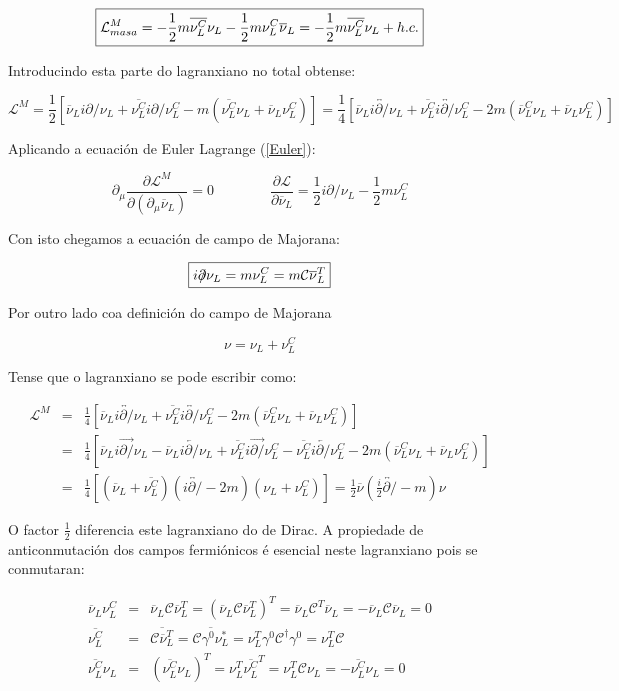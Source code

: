 \documentclass[a4paper,10pt]{article}
\newcommand{\beq}{\begin{equation}}
\newcommand{\eeq}{\end{equation}}
\newcommand{\bea}{\begin{eqnarray}}
\newcommand{\eea}{\end{eqnarray}}
\newcommand{\bbx}{\begin{boxed}}
\newcommand{\ebx}{\end{boxed}}
\newcommand{\barra}[1]{\overline{#1}}
\newcommand{\lvec}[1]{\overleftarrow{#1}}
\newcommand{\rvec}[1]{\overrightarrow{#1}}
\newcommand{\dvec}[1]{\overleftrightarrow{#1}}
\newcommand{\chula}[1]{\mathcal{#1}}
\newcommand{\slx}[1]{ #1\!\!\!/ }
\newcommand{\derp}[2]{\frac{\partial#1}{\partial#2}}
\begin{document}
\beq
\bbx{
\chula L_{masa}^M = -\frac{1}{2} m \barra{\nu_L^C} \nu_L - \frac{1}{2} m \nu_L^C \barra\nu_L = -\frac{1}{2} m \barra{\nu_L^C} \nu_L + h.c.
}\ebx
\eeq

Introducindo esta parte do lagranxiano no total obtense:

\beq
\chula L^M = \frac{1}{2} \left[ \barra\nu_L i\slx\partial \nu_L + \barra{\nu_L^C} i\slx\partial \nu_L^C - m \left( \barra{\nu_L^C} \nu_L + \barra\nu_L \nu_L^C \right) \right] = \frac{1}{4} \left[ \barra\nu_L i \dvec{\slx\partial} \nu_L + \barra{\nu_L^C} i\dvec{\slx\partial} \nu_L^C - 2m \left( \barra\nu_L^C \nu_L + \barra\nu_L \nu_L^C \right) \right]
\eeq

Aplicando a ecuación de Euler Lagrange (\ref{Euler}):

\beq
\partial_\mu \derp{\chula L^M}{(\partial_\mu \barra\nu_L)} = 0 \qquad \qquad
\frac{\partial \chula L}{ \partial \barra\nu_L} = \frac{1}{2} i\slx\partial \nu_L - \frac{1}{2} m \nu_L^C
\eeq

Con isto chegamos a ecuación de campo de Majorana:

\beq
\bbx{
i\slx\partial \nu_L = m \nu_L^C = m \chula C \barra\nu_L^T
}\ebx
\eeq

Por outro lado coa definición do campo de Majorana

\beq
\nu = \nu_L + \nu_L^C
\eeq

Tense que o lagranxiano se pode escribir como:

\bea
\chula L^M &=& \frac{1}{4} \left[ \barra\nu_L i \dvec{\slx\partial} \nu_L + \barra{\nu_L^C} i\dvec{\slx\partial} \nu_L^C - 2m \left( \barra\nu_L^C \nu_L + \barra\nu_L \nu_L^C \right) \right] \nonumber \\
&=& \frac{1}{4} \left[ \barra\nu_L i \rvec{\slx\partial} \nu_L - \barra\nu_L i \lvec{\slx\partial} \nu_L +  \barra{\nu_L^C} i\rvec{\slx\partial} \nu_L^C - \barra{\nu_L^C} i\lvec{\slx\partial} \nu_L^C - 2m \left( \barra\nu_L^C \nu_L + \barra\nu_L \nu_L^C \right) \right] \nonumber \\
&=&\frac{1}{4} \left[ \left( \barra\nu_L + \barra{\nu_L^C} \right) \left( i\dvec{\slx\partial} - 2m \right) \left( \nu_L + \nu_L^C\right) \right]= \frac{1}{2} \barra\nu \left( \frac{i}{2} \dvec{\slx\partial} - m \right) \nu
\eea

O factor $\frac{1}{2}$ diferencia este lagranxiano do de Dirac. A propiedade de anticonmutación dos campos fermiónicos é esencial neste lagranxiano pois se conmutaran:

\bea
\barra\nu_L \nu_L^C &=& \barra\nu_L \chula C \barra\nu_L^T = \left( \barra\nu_L \chula C \barra\nu_L^T \right)^T = \barra\nu_L \chula C^T \barra\nu_L = - \barra\nu_L \chula C \barra\nu_L = 0 \nonumber \\
\barra{\nu_L^C} &=& \barra{ \chula C \barra\nu_L^T} = \barra{ \chula C \gamma^0 \nu_L^* } = \nu_L^T \gamma^0 \chula C^\dag \gamma^0 = \nu_L^T \chula C \nonumber \\
\barra{\nu_L^C} \nu_L &=& \left( \barra{\nu_L^C} \nu_L\right)^T = \nu_L^T \barra{\nu_L^C}^T = \nu_L^T \chula C \nu_L = - \barra{\nu_L^C} \nu_L = 0 \nonumber
\eea
\end{document}
